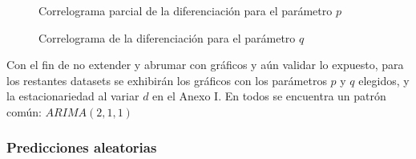 \documentclass[a4paper,10pt]{article}
\begin{document}
\begin{figure}[h!]
 \centering
  \caption{Correlograma parcial de la diferenciación para el parámetro $p$}
  \label{f:fac_btc_p}
\end{figure}

\begin{figure}[h!]
 \centering
  \caption{Correlograma de la diferenciación para el parámetro $q$}
  \label{f:fac_btc_q}
\end{figure}

Con el fin de no extender y abrumar con gráficos y aún validar lo expuesto, para los restantes datasets se exhibirán los gráficos con los parámetros $p$ y $q$ elegidos, y la estacionariedad al variar $d$ en el Anexo I. En todos se encuentra un patrón común: $ARIMA(2,1,1)$

\subsubsection{Predicciones aleatorias}
\end{document}
